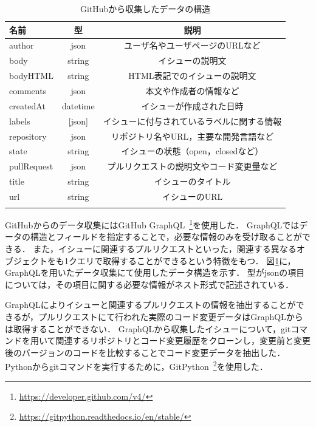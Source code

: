 
\begin{table}[t]

  \centering
  \caption{GitHubから収集したデータの構造}
  \label{table:format_collected_GH_data}
    
  \begin{tabular}{l | c | c } \Xhline{3\arrayrulewidth}
      名前 & 型 & 説明 \\ \hline \hline
      author & json & ユーザ名やユーザページのURLなど\\
      body & string & イシューの説明文  \\
      bodyHTML & string & HTML表記でのイシューの説明文 \\
      comments & json & 本文や作成者の情報など \\
      createdAt & datetime & イシューが作成された日時 \\
      labels & [json] & イシューに付与されているラベルに関する情報 \\
      repository & json & リポジトリ名やURL，主要な開発言語など\\  
      state & string & イシューの状態（open，closedなど） \\
      pullRequest & json & プルリクエストの説明文やコード変更量など \\
      title & string & イシューのタイトル \\
      url & string & イシューのURL \\
      
      \Xhline{3\arrayrulewidth}
  \end{tabular}
\end{table}

GitHubからのデータ収集にはGitHub GraphQL~\footnote{\url{https://developer.github.com/v4/}}を使用した．
GraphQLではデータの構造とフィールドを指定することで，必要な情報のみを受け取ることができる．
また，イシューに関連するプルリクエストといった，関連する異なるオブジェクトをも1クエリで取得することができるという特徴をもつ．
図\ref{table:format_collected_GH_data}に，GraphQLを用いたデータ収集にて使用したデータ構造を示す．
型がjsonの項目については，その項目に関する必要な情報がネスト形式で記述されている．

GraphQLによりイシューと関連するプルリクエストの情報を抽出することができるが，プルリクエストにて行われた実際のコード変更データはGraphQLからは取得することができない．
GraphQLから収集したイシューについて，gitコマンドを用いて関連するリポジトリとコード変更履歴をクローンし，変更前と変更後のバージョンのコードを比較することでコード変更データを抽出した．
Pythonからgitコマンドを実行するために，GitPython~\footnote{\url{https://gitpython.readthedocs.io/en/stable/}}を使用した．
  
